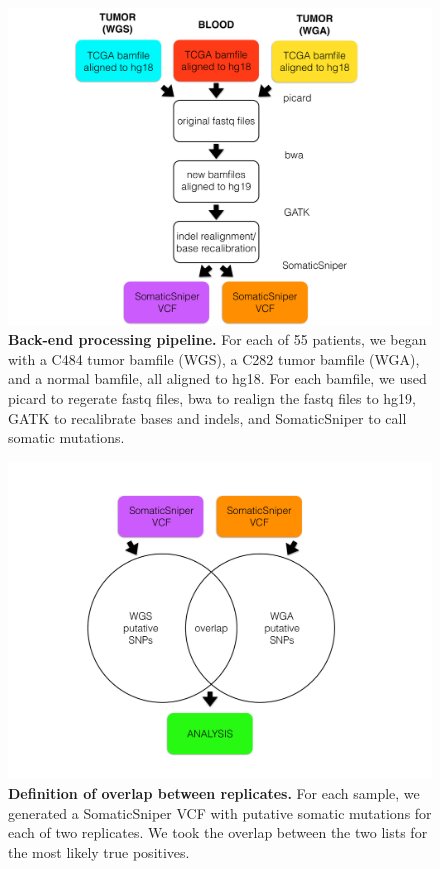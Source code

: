 \documentclass[11pt]{article} %
\begin{document}
\begin{figure}
\centerline{
\includegraphics[width=6in]{figure1.pdf} }
\caption{\textbf{Back-end processing pipeline.} For each of 55 patients, we began with a C484 tumor bamfile (WGS), a C282 tumor bamfile (WGA), and a normal bamfile, all aligned to hg18. For each bamfile, we used picard to regerate fastq files, bwa to realign the fastq files to hg19, GATK to recalibrate bases and indels, and SomaticSniper to call somatic mutations.}
\end{figure}

\begin{figure}
\centerline{
\includegraphics[width=6in]{figure2.pdf} }
\caption{\textbf{Definition of overlap between replicates.} For each sample, we generated a SomaticSniper VCF with putative somatic mutations for each of two replicates. We took the overlap between the two lists for the most likely true positives.}
\end{figure}
\end{document}
